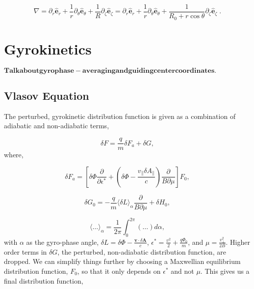 \documentclass[12pt]{article}
\begin{document}
   \begin{equation}
      \nabla = \partial_r\bm{\hat{e}}_r + \frac{1}{r}\partial_\theta\bm{\hat{e}}_\theta +
               \frac{1}{R}\partial_\zeta\bm{\hat{e}}_\zeta = \partial_r\bm{\hat{e}}_r   +
               \frac{1}{r}\partial_\theta\bm{\hat{e}}_\theta + \frac{1}{R_0 + r\cos\theta}\partial_\zeta\bm{\hat{e}}_\zeta\;.
   \end{equation}

\section{Gyrokinetics}
   \quad $\bm{Talk about gyrophase-averaging and guiding center coordinates.}$

\subsection{Vlasov Equation}
   \quad The perturbed, gyrokinetic distribution function is given as a combination of adiabatic
and non-adiabatic terms\cite{FriemanChen},

   \begin{equation}
      \delta F = \frac{q}{m}\delta F_a + \delta G,
   \end{equation}
where,
    
   \begin{equation}
      \delta F_a = [\delta\Phi\frac{\partial}{\partial\epsilon^*} + (\delta\Phi - \frac{v_\parallel \delta A_\parallel}
                   {c})\frac{\partial}{B\partial\mu}]F_0, 
   \end{equation}
   
   \begin{equation}
      \delta G_0 = -\frac{q}{m}\langle\delta L\rangle_\alpha\frac{\partial}{B\partial\mu} + \delta H_0,
   \end{equation}

   \begin{equation}
      \langle\ldots\rangle_\alpha = \frac{1}{2\pi}\int_{0}^{2\pi}(\ldots)d\alpha,
   \end{equation}
with $\alpha$ as the gyro-phase angle, $\delta L = \delta\Phi - \frac{\bm{v}\cdot\delta\bm{A}}{c}$, $\epsilon^* = \frac{v^2}{2} + 
\frac{q\Phi_0}{m}$, and $\mu = \frac{v_\perp^2}{2B}$. Higher order terms in $\delta G$, the perturbed, non-adiabatic distribution function,
are dropped. We can simplify things further by choosing a Maxwellian equilibrium distribution function, $F_0$, so that it only depends
on $\epsilon^*$ and not $\mu$. This gives us a final distribution function,
\end{document}
